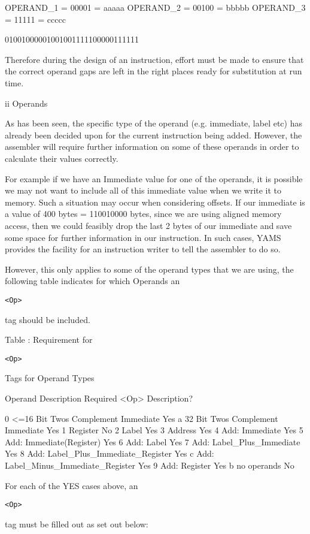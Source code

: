\documentclass[12pt]{report}
\begin{document}
\begin{enumerate}
OPERAND_1 = 00001 = aaaaa
OPERAND_2 = 00100 = bbbbb
OPERAND_3 = 11111 = ccccc

01001000001001001111100000111111

Therefore during the design of an instruction, effort must be made to ensure that the correct operand gaps are left in the right places ready for substitution at run time.


ii	Operands

As has been seen, the specific type of the operand (e.g. immediate, label etc) has already been decided upon for the current instruction being added. However, the assembler will require further information on some of these operands in order to calculate their values correctly.

For example if we have an Immediate value for one of the operands, it is possible we may not want to include all of this immediate value when we write it to memory. Such a situation may occur when considering offsets. If our immediate is a value of 400 bytes = 110010000 bytes, since we are using aligned memory access, then we could feasibly drop the last 2 bytes of our immediate and save some space for further information in our instruction. In such cases, YAMS provides the facility for an instruction
writer to tell the assembler to do so.

However, this only applies to some of the operand types that we are using, the following table indicates for which Operands an \begin{verbatim}<Op>\end{verbatim} tag should be included.

Table : Requirement for \begin{verbatim}<Op>\end{verbatim} Tags for Operand Types

Operand 	Description					Required <Op> Description?

0 		<=16 Bit Twos Complement Immediate		Yes
a 		32 Bit Twos Complement Immediate		Yes
1 		Register					No
2 		Label						Yes
3 		Address						Yes
4 		Add: Immediate					Yes
5 		Add: Immediate(Register)			Yes
6 		Add: Label					Yes
7 		Add: Label_Plus_Immediate			Yes
8 		Add: Label_Plus_Immediate_Register		Yes
c 		Add: Label_Minus_Immediate_Register		Yes
9 		Add: Register					Yes
b 		no operands					No

For each of the YES cases above, an \begin{verbatim}<Op>\end{verbatim} tag must be filled out as set out below:


\end{enumerate}
\end{document}
